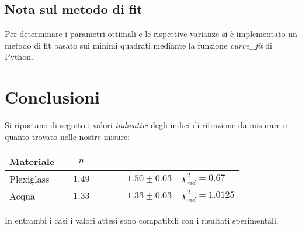 \documentclass{article}[a4paper,11pt]
\begin{document}
\subsection*{Nota sul metodo di fit}
Per determinare i parametri ottimali e le rispettive varianze si \`e implementato un metodo di fit basato sui minimi quadrati mediante la funzione \emph{curve\_fit} di Python.

\section{Conclusioni}
Si riportano di seguito i valori \emph{indicativi} degli indici di rifrazione
da misurare e quanto trovato nelle nostre misure:
\begin{center}
\begin{tabular}{lccccccl}
\midrule
Materiale & & $n$ & & & & & \\
\midrule
\midrule
Plexiglass & & $1.49$ & & & &$1.50 \pm 0.03 $& $\chi_{rid}^2 = 0.67$\\
Acqua & & $1.33$ & & & & $1.33 \pm 0.03$ & $\chi_{rid}^2 = 1.0125$\\
\bottomrule
\end{tabular}
\end{center}
In entrambi i casi i valori attesi sono compatibili con i risultati sperimentali.
\end{document}
